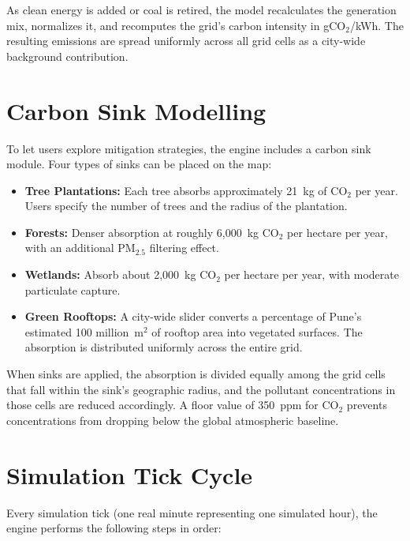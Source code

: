 \documentclass[a4paper, 12pt]{report}
\begin{document}
As clean energy is added or coal is retired, the model recalculates the generation mix, normalizes it, and recomputes the grid's carbon intensity in gCO$_2$/kWh. The resulting emissions are spread uniformly across all grid cells as a city-wide background contribution.

\section{Carbon Sink Modelling}
To let users explore mitigation strategies, the engine includes a carbon sink module. Four types of sinks can be placed on the map:

\begin{itemize}
\item \textbf{Tree Plantations:} Each tree absorbs approximately 21~kg of CO$_2$ per year. Users specify the number of trees and the radius of the plantation.
\item \textbf{Forests:} Denser absorption at roughly 6,000~kg CO$_2$ per hectare per year, with an additional PM$_{2.5}$ filtering effect.
\item \textbf{Wetlands:} Absorb about 2,000~kg CO$_2$ per hectare per year, with moderate particulate capture.
\item \textbf{Green Rooftops:} A city-wide slider converts a percentage of Pune's estimated 100 million~m$^2$ of rooftop area into vegetated surfaces. The absorption is distributed uniformly across the entire grid.
\end{itemize}

When sinks are applied, the absorption is divided equally among the grid cells that fall within the sink's geographic radius, and the pollutant concentrations in those cells are reduced accordingly. A floor value of 350~ppm for CO$_2$ prevents concentrations from dropping below the global atmospheric baseline.

\section{Simulation Tick Cycle}
Every simulation tick (one real minute representing one simulated hour), the engine performs the following steps in order:
\end{document}
